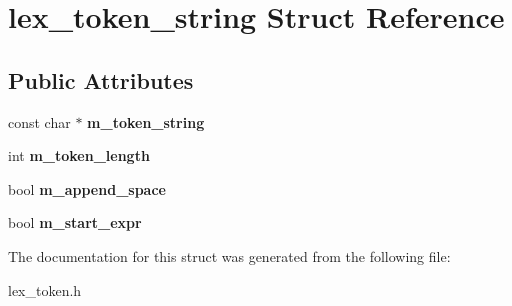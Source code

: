 \hypertarget{structlex__token__string}{}\section{lex\+\_\+token\+\_\+string Struct Reference}
\label{structlex__token__string}
\subsection*{Public Attributes}
\begin{DoxyCompactItemize}
\item 
\mbox{\label{structlex__token__string_ac6e70bafd1fc8bcce6d927cc4a2a427f}} 
const char $\ast$ {\bfseries m\+\_\+token\+\_\+string}
\item 
\mbox{\label{structlex__token__string_a3ed8717445062ba204048a8b69b3fef8}} 
int {\bfseries m\+\_\+token\+\_\+length}
\item 
\mbox{\label{structlex__token__string_adfb9318fe17197d0900439e6f2489b36}} 
bool {\bfseries m\+\_\+append\+\_\+space}
\item 
\mbox{\label{structlex__token__string_aa0021ba6422604b7f65eb002b4079881}} 
bool {\bfseries m\+\_\+start\+\_\+expr}
\end{DoxyCompactItemize}


The documentation for this struct was generated from the following file\+:\begin{DoxyCompactItemize}
\item 
lex\+\_\+token.\+h\end{DoxyCompactItemize}
